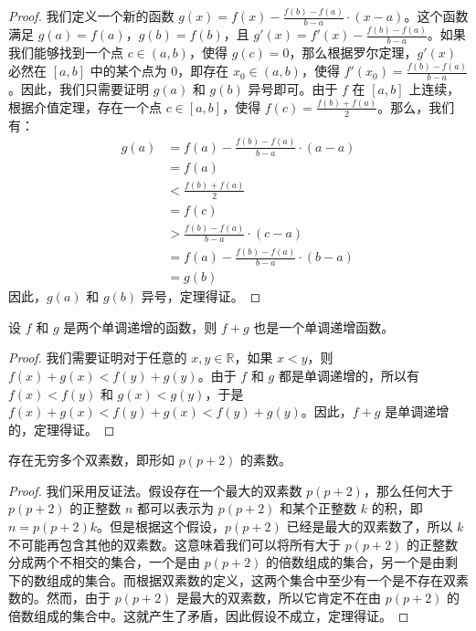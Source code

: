 \begin{proof}
我们定义一个新的函数 $g(x) = f(x) - \frac{f(b)-f(a)}{b-a} \cdot (x-a)$。这个函数满足 $g(a) = f(a)$，$g(b) = f(b)$，且 $g'(x) = f'(x) - \frac{f(b)-f(a)}{b-a}$。如果我们能够找到一个点 $c \in (a,b)$，使得 $g(c) = 0$，那么根据罗尔定理，$g'(x)$ 必然在 $[a,b]$ 中的某个点为 $0$，即存在 $x_0 \in (a,b)$，使得 $f'(x_0) = \frac{f(b)-f(a)}{b-a}$。因此，我们只需要证明 $g(a)$ 和 $g(b)$ 异号即可。由于 $f$ 在 $[a,b]$ 上连续，根据介值定理，存在一个点 $c \in [a,b]$，使得 $f(c) = \frac{f(b)+f(a)}{2}$。那么，我们有：
\begin{align*}
g(a) &= f(a) - \frac{f(b)-f(a)}{b-a} \cdot (a-a) \\
&= f(a) \\
&< \frac{f(b)+f(a)}{2} \\
&= f(c) \\
&> \frac{f(b)-f(a)}{b-a} \cdot (c-a) \\
&= f(a) - \frac{f(b)-f(a)}{b-a} \cdot (b-a) \\
&= g(b)
\end{align*}
因此，$g(a)$ 和 $g(b)$ 异号，定理得证。
\end{proof}

\begin{prop}
设 $f$ 和 $g$ 是两个单调递增的函数，则 $f+g$ 也是一个单调递增函数。
\end{prop}

\begin{proof}
我们需要证明对于任意的 $x,y \in \mathbb{R}$，如果 $x < y$，则 $f(x)+g(x) < f(y)+g(y)$。由于 $f$ 和 $g$ 都是单调递增的，所以有 $f(x) < f(y)$ 和 $g(x) < g(y)$，于是 $f(x)+g(x) < f(y)+g(x) < f(y)+g(y)$。因此，$f+g$ 是单调递增的，定理得证。
\end{proof}

\begin{conj}
存在无穷多个双素数，即形如 $p(p+2)$ 的素数。
\end{conj}

\begin{proof}
我们采用反证法。假设存在一个最大的双素数 $p(p+2)$，那么任何大于 $p(p+2)$ 的正整数 $n$ 都可以表示为 $p(p+2)$ 和某个正整数 $k$ 的积，即 $n = p(p+2)k$。但是根据这个假设，$p(p+2)$ 已经是最大的双素数了，所以 $k$ 不可能再包含其他的双素数。这意味着我们可以将所有大于 $p(p+2)$ 的正整数分成两个不相交的集合，一个是由 $p(p+2)$ 的倍数组成的集合，另一个是由剩下的数组成的集合。而根据双素数的定义，这两个集合中至少有一个是不存在双素数的。然而，由于 $p(p+2)$ 是最大的双素数，所以它肯定不在由 $p(p+2)$ 的倍数组成的集合中。这就产生了矛盾，因此假设不成立，定理得证。
\end{proof}

